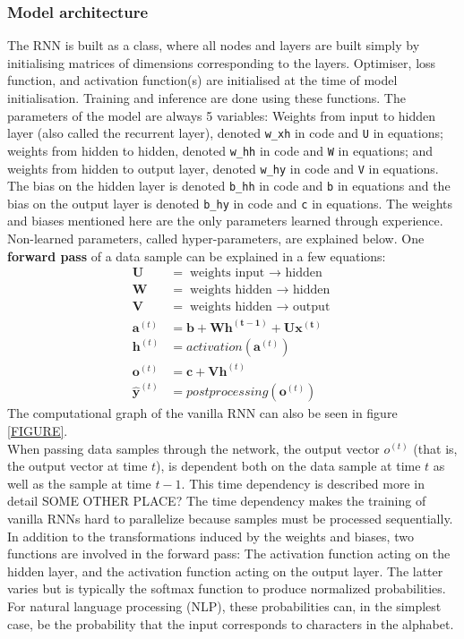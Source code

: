 \documentclass[12pt]{article}
\begin{document}
\subsubsection*{Model architecture}
The RNN is built as a class, where all nodes and layers are built simply by initialising matrices of dimensions corresponding to the layers. Optimiser, loss function, and activation function(s) are initialised at the time of model initialisation. Training and inference are done using these functions. The parameters of the model are always 5 variables: Weights from input to hidden layer (also called the recurrent layer), denoted \texttt{w\_xh} in code and \texttt{U} in equations; weights from hidden to hidden, denoted \texttt{w\_hh} in code and \texttt{W} in equations; and weights from hidden to output layer, denoted \texttt{w\_hy} in code and \texttt{V} in equations. The bias on the hidden layer is denoted \texttt{b\_hh} in code and \texttt{b} in equations and the bias on the output layer is denoted \texttt{b\_hy} in code and \texttt{c} in equations. The weights and biases mentioned here are the only parameters learned through experience. Non-learned parameters, called hyper-parameters, are explained below. One \textbf{forward pass} of a data sample can be explained in a few equations:
\begin{align}
    \mathbf{U} &= \text{weights input $\rightarrow$ hidden} \\
    \mathbf{W} &= \text{weights hidden $\rightarrow$ hidden} \\
    \mathbf{V} &= \text{weights hidden $\rightarrow$ output} \\
    \mathbf{a}^{(t)} &= \mathbf{b + Wh^{(t-1)} + Ux^{(t)}} \\
    \mathbf{h}^{(t)} &= activation(\mathbf{a}^{(t)})\\
    \mathbf{o}^{(t)} &= \mathbf{c + Vh}^{(t)} \\
    \mathbf{\hat{y}}^{(t)} &= postprocessing(\mathbf{o}^{(t)})
\end{align}
The computational graph of the vanilla RNN can also be seen in figure \cref{FIGURE}. \\
When passing data samples through the network, the output vector $o^{(t)}$ (that is, the output vector at time $t$), is dependent both on the data sample at time $t$ as well as the sample at time $t-1$. This time dependency is described more in detail SOME OTHER PLACE? The time dependency makes the training of vanilla RNNs hard to parallelize because samples must be processed sequentially. In addition to the transformations induced by the weights and biases, two functions are involved in the forward pass: The activation function acting on the hidden layer, and the activation function acting on the output layer. The latter varies but is typically the softmax function to produce normalized probabilities. For natural language processing (NLP), these probabilities can, in the simplest case, be the probability that the input corresponds to characters in the alphabet.
\end{document}
